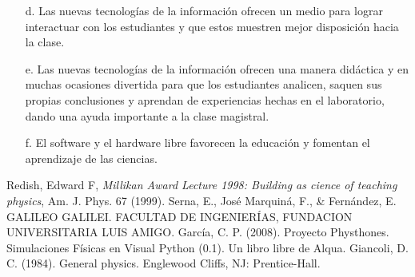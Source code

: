 \documentclass[12pt]{article}
\begin{document}
\begin{multicols}{2}
\begin{enumerate}
\item[d. ] Las nuevas tecnologías de la información ofrecen un medio para lograr interactuar con los estudiantes y que estos muestren mejor disposición hacia la clase. 

\item[e. ] Las nuevas tecnologías de la información ofrecen una manera didáctica y en muchas ocasiones divertida para que los estudiantes analicen, saquen sus propias conclusiones y aprendan de experiencias hechas en el laboratorio, dando una ayuda importante a la clase magistral.

\item[f. ] El software y el hardware libre favorecen la educación y fomentan el aprendizaje de las ciencias.

\end{enumerate}
\end{multicols}
\begin{thebibliography}{99}
 Redish, Edward F, \emph{Millikan Award Lecture 1998: Building as cience of teaching physics}, Am. J. Phys. 67 (1999).
 Serna, E., José Marquiná, F., \& Fernández, E. GALILEO GALILEI. FACULTAD DE INGENIERÍAS, FUNDACION UNIVERSITARIA LUIS AMIGO.
 García, C. P. (2008). Proyecto Physthones. Simulaciones Físicas en Visual Python (0.1). Un libro libre de Alqua.
 Giancoli, D. C. (1984). General physics. Englewood Cliffs, NJ: Prentice-Hall.

\end{thebibliography}
\end{document}
